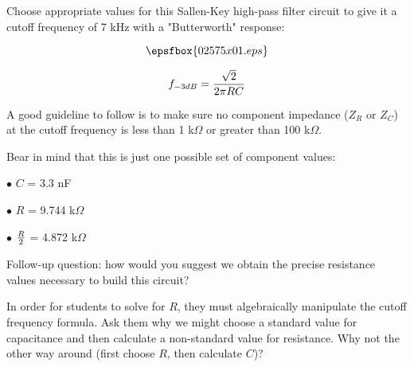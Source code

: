 

Choose appropriate values for this Sallen-Key high-pass filter circuit to give it a cutoff frequency of 7 kHz with a "Butterworth" response:

$$\epsfbox{02575x01.eps}$$

$$f_{-3dB} = {\sqrt{2} \over {2 \pi R C}}$$

A good guideline to follow is to make sure no component impedance ($Z_R$ or $Z_C$) at the cutoff frequency is less than 1 k$\Omega$ or greater than 100 k$\Omega$.







Bear in mind that this is just one possible set of component values:

\medskip
\item{$\bullet$} $C$ = 3.3 nF
\item{$\bullet$} $R$ = 9.744 k$\Omega$
\item{$\bullet$} ${R \over 2}$ = 4.872 k$\Omega$
\medskip

\vskip 10pt

Follow-up question: how would you suggest we obtain the precise resistance values necessary to build this circuit?







In order for students to solve for $R$, they must algebraically manipulate the cutoff frequency formula.  Ask them why we might choose a standard value for capacitance and then calculate a non-standard value for resistance.  Why not the other way around (first choose $R$, then calculate $C$)?




